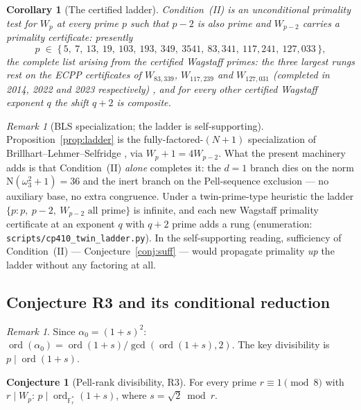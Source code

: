 \documentclass[11pt]{amsart}
\theoremstyle{plain}
\newtheorem{corollary}[theorem]{Corollary}
\theoremstyle{definition}
\newtheorem{conjecture}[theorem]{Conjecture}
\theoremstyle{remark}
\newtheorem{remark}[theorem]{Remark}
\numberwithin{equation}{section}
\newcommand{\ord}{\operatorname{ord}}
\newcommand{\F}{\mathbb{F}}
\begin{document}
\begin{corollary}[The certified ladder]\label{cor:ladder}
Condition~(II) is an unconditional primality test for $W_p$ at every prime $p$ such that $p - 2$ is also prime and $W_{p-2}$ carries a primality certificate: presently
\[
  p \;\in\; \{\,5,\ 7,\ 13,\ 19,\ 103,\ 193,\ 349,\ 3541,\ 83{,}341,\ 117{,}241,\ 127{,}033\,\},
\]
the complete list arising from the certified Wagstaff primes: the three largest rungs rest on the ECPP certificates of $W_{83{,}339}$, $W_{117{,}239}$ and $W_{127{,}031}$ (completed in 2014, 2022 and 2023 respectively) \cite{ref:PrimePagesWagstaff}, and for every other certified Wagstaff exponent $q$ the shift $q + 2$ is composite.
\end{corollary}

\begin{remark}[BLS specialization; the ladder is self-supporting]\label{rem:ladder}
Proposition~\ref{prop:ladder} is the fully-factored-$(N+1)$ specialization of Brillhart--Lehmer--Selfridge \cite{ref:BLS}, via $W_p + 1 = 4 W_{p-2}$. What the present machinery adds is that Condition~(II) \emph{alone} completes it: the $d = 1$ branch dies on the norm $\mathrm N(\omega_3^2 + 1) = 36$ and the inert branch on the Pell-sequence exclusion --- no auxiliary base, no extra congruence. Under a twin-prime-type heuristic the ladder $\{p : p,\ p-2,\ W_{p-2} \text{ all prime}\}$ is infinite, and each new Wagstaff primality certificate at an exponent $q$ with $q + 2$ prime adds a rung (enumeration: \texttt{scripts/cp410\_twin\_ladder.py}). In the self-supporting reading, sufficiency of Condition~(II) --- Conjecture~\ref{conj:suff} --- would propagate primality \emph{up} the ladder without any factoring at all.
\end{remark}

\subsection{Conjecture R3 and its conditional reduction}

\begin{remark}\label{rem:alpha0-square}
Since $\alpha_0 = (1 + s)^2$: $\ord(\alpha_0) = \ord(1 + s) / \gcd(\ord(1+s), 2)$. The key divisibility is $p \mid \ord(1 + s)$.
\end{remark}

\begin{conjecture}[Pell-rank divisibility, R3]\label{conj:R3}
For every prime $r \equiv 1 \pmod 8$ with $r \mid W_p$: $p \mid \ord_{\F_r^\ast}(1 + s)$, where $s = \sqrt 2 \bmod r$.
\end{conjecture}
\end{document}
